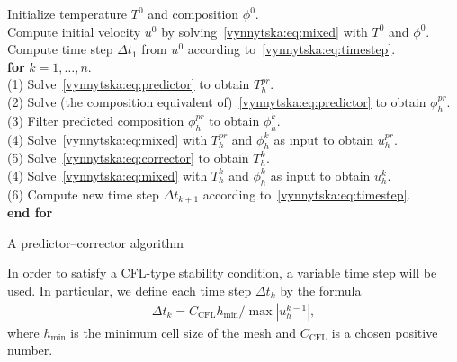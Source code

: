 \begin{algorithm}
  \begin{tabbing}
    Initialize temperature $T^0$ and composition $\phi^0$. \\
    Compute initial velocity $u^0$ by
    solving~\eqref{vynnytska:eq:mixed} with $T^0$ and $\phi^0$. \\
    Compute time step $\Delta t_1$ from $u^0$ according
    to~\eqref{vynnytska:eq:timestep}. \\
    \textbf{for}  {$k = 1, \dots, n$}. \\
    \tab (1) Solve~\eqref{vynnytska:eq:predictor} to obtain $T_h^{pr}$. \\
    \tab (2) Solve (the composition equivalent
    of)~\eqref{vynnytska:eq:predictor} to obtain $\phi_h^{pr}$. \\
    \tab (3) Filter predicted composition $\phi_h^{pr}$ to
    obtain $\phi_h^{k}$. \\
    \tab (4) Solve~\eqref{vynnytska:eq:mixed} with $T_h^{pr}$ and
    $\phi_h^{k}$ as input to obtain $u_h^{pr}$. \\
    \tab (5) Solve~\eqref{vynnytska:eq:corrector} to obtain $T_h^{k}$. \\
    \tab (4) Solve~\eqref{vynnytska:eq:mixed} with $T_h^{k}$ and
    $\phi_h^{k}$ as input to obtain $u_h^{k}$. \\
    \tab (6) Compute new time step $\Delta t_{k+1}$ according
    to~\eqref{vynnytska:eq:timestep}. \\
    \textbf{end for}
  \end{tabbing}
  \caption{A predictor--corrector algorithm}
  \label{vynnytska:alg:algorithm}
\end{algorithm}

In order to satisfy a CFL-type stability condition, a variable time
step will be used. In particular, we define each time step $\Delta
t_k$ by the formula
\begin{align}
   \label{vynnytska:eq:timestep}
   \Delta t_k =  C_{\mathrm{CFL}} h_{\min} / \max{|u^{k-1}_h|},
\end{align}
where $h_{\min}$ is the minimum cell size of the mesh and $C_{\mathrm{CFL}}$ is
a chosen positive number.

